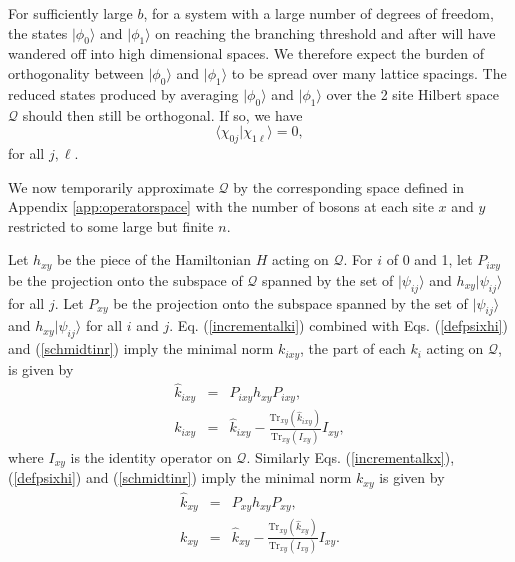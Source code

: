 \documentclass[twocolumn,amsmath,amssymb]{revtex4-1}
\begin{document}
For sufficiently large $b$, for a system with a large number
of degrees of freedom, the states $|\phi_0 \rangle $ and $|\phi_1 \rangle $
on reaching the branching threshold and after will have wandered off into high dimensional spaces.
We therefore expect
the burden of orthogonality between $|\phi_0 \rangle $ and $|\phi_1 \rangle $
to be spread over many lattice spacings.
The reduced states produced by averaging
$|\phi_0 \rangle $ and $|\phi_1 \rangle $
over the 2 site Hilbert space $\mathcal{Q}$
should then still be orthogonal.
If so, we have
\begin{equation}
  \label{schmidtinr}
   \langle  \chi_{0j} | \chi_{1\ell} \rangle  = 0,
\end{equation}
for all $j, \ell$.

We now temporarily approximate $\mathcal{Q}$ by the corresponding space defined
in Appendix \ref{app:operatorspace} with the number of bosons at each site $x$ and $y$
restricted to some large but finite $n$.

Let $h_{xy}$ be the piece of the Hamiltonian $H$ acting on $\mathcal{Q}$.
For $i$ of 0 and 1, let $P_{ixy}$ be the projection onto the subspace of $\mathcal{Q}$ spanned by
the set of $|\psi_{ij} \rangle $ and $h_{xy} |\psi_{ij} \rangle $ for all $j$.
Let $P_{xy}$ be the projection 
onto the subspace spanned by the set of $|\psi_{ij} \rangle $ and $h_{xy} |\psi_{ij} \rangle $ for all $i$ and $j$.
Eq. (\ref{incrementalki}) combined
with Eqs. (\ref{defpsixhi}) and (\ref{schmidtinr}) imply the minimal norm $k_{ixy}$, the part of each $k_i$
acting on $\mathcal{Q}$, is given by
\begin{subequations}
\begin{eqnarray}
  \label{hatkixy}
  \hat{k}_{ixy} & = & P_{ixy} h_{xy} P_{ixy}, \\
\label{optimalkixy}
  k_{ixy} & = & \hat{k}_{ixy} - \frac{\mathrm{Tr}_{xy} (\hat{k}_{ixy})}{\mathrm{Tr}_{xy} (I_{xy})} I_{xy},
\end{eqnarray}
\end{subequations}
where $I_{xy}$ is the identity operator on $\mathcal{Q}$.
Similarly Eqs. (\ref{incrementalkx}), (\ref{defpsixhi}) and (\ref{schmidtinr}) imply
the minimal norm $k_{xy}$ is given by
\begin{subequations}
\begin{eqnarray}
  \label{hatkxy}
  \hat{k}_{xy} & = & P_{xy} h_{xy} P_{xy}, \\
\label{optimalkxy}
  k_{xy} & = & \hat{k}_{xy} - \frac{\mathrm{Tr}_{xy} (\hat{k}_{xy})}{\mathrm{Tr}_{xy} (I_{xy})} I_{xy}.
\end{eqnarray}
\end{subequations}
\end{document}

